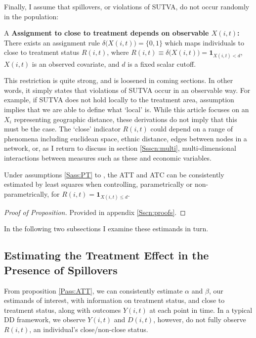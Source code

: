 Finally, I assume that spillovers, or violations of SUTVA, do not occur randomly
in the population:
\begin{assumption}{4}{A}
\label{Sass:SUTVAl}
\textbf{Assignment to close to treatment depends on observable $X(i,t)$:} \\ 
There exists an assignment rule $\delta\Big(X(i,t)\Big)=\{0,1\}$ which maps 
individuals to close to treatment status $R(i,t)$, where $R(i,t)\equiv\delta
\Big(X(i,t)\Big)=\mathbf{1}_{X(i,t)<d}$, $X(i,t)$ is an observed covariate, and 
$d$ is a fixed scalar cutoff. 
\end{assumption}
\vspace{-4mm}
\noindent This restriction is quite strong, and is loosened in coming sections.  
In other words, it simply states 
that violations of SUTVA occur in an observable way.  For example, if SUTVA does
not hold locally to the treatment area, assumption  implies
that we are able to define what `local' is.  While this article focuses on
an $X_i$ representing geographic distance, these derivations do not imply that 
this must be the case.  The `close' indicator $R(i,t)$ could depend on a range 
of phenomena including euclidean space, ethnic distance, edges between
nodes in a network, or, as I return to discuss in section \ref{Ssscn:multi}, 
multi-dimensional interactions between measures such as these and economic 
variables. 
\begin{proposition}
\label{Pass:ATT}
Under assumptions \ref{Sass:PT} to , the ATT and ATC can be 
consistently estimated by least squares when controlling, parametrically or
non-parametrically, for $R(i,t)=\mathbf{1}_{X(i,t)\leq d}$.
\end{proposition}
\renewcommand{\qedsymbol}{$\blacksquare$}
\begin{proof}[Proof of Proposition]
Provided in appendix \ref{Sscn:proofs}.
\end{proof}
\noindent In the following two subsections I examine these estimands in turn. 

\subsection{Estimating the Treatment Effect in the Presence of Spillovers}
\label{Ssscn:TE}
From proposition \ref{Pass:ATT}, we can consistently estimate $\alpha$ and 
$\beta$, our estimands of interest, with information on treatment status, and 
close to treatment status, along with outcomes $Y(i,t)$ at each point in time. In 
a typical DD framework, we observe $Y(i,t)$ and $D(i,t)$, however, do not fully 
observe $R(i,t)$, an individual's close/non-close status.

